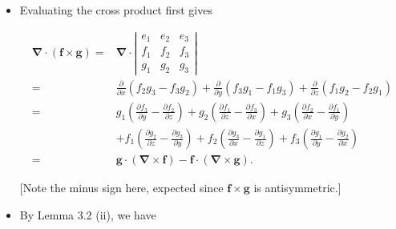 \begin{formalproof}
\begin{itemize}
\item[(iii)] Evaluating the cross product first gives

\[
\begin{aligned}
\boldsymbol{\nabla} \cdot(\boldsymbol{f} \times \boldsymbol{g})= & \boldsymbol{\nabla} \cdot\left|\begin{array}{lll}
e_1 & e_2 & e_3 \\
f_1 & f_2 & f_3 \\
g_1 & g_2 & g_3
\end{array}\right| \\
= & \frac{\partial}{\partial x}\left(f_2 g_3-f_3 g_2\right)+\frac{\partial}{\partial y}\left(f_3 g_1-f_1 g_3\right)+\frac{\partial}{\partial z}\left(f_1 g_2-f_2 g_1\right) \\
= & g_1\left(\frac{\partial f_3}{\partial y}-\frac{\partial f_2}{\partial z}\right)+g_2\left(\frac{\partial f_1}{\partial z}-\frac{\partial f_3}{\partial x}\right)+g_3\left(\frac{\partial f_2}{\partial x}-\frac{\partial f_1}{\partial y}\right) \\
& +f_1\left(\frac{\partial g_2}{\partial z}-\frac{\partial g_3}{\partial y}\right)+f_2\left(\frac{\partial g_3}{\partial x}-\frac{\partial g_1}{\partial z}\right)+f_3\left(\frac{\partial g_1}{\partial y}-\frac{\partial g_2}{\partial x}\right) \\
= & \boldsymbol{g} \cdot(\boldsymbol{\nabla} \times \boldsymbol{f})-\boldsymbol{f} \cdot(\boldsymbol{\nabla} \times \boldsymbol{g}) .
\end{aligned}
\]

[Note the minus sign here, expected since \(\boldsymbol{f} \times \boldsymbol{g}\) is antisymmetric.]
\item [(iv)] By Lemma 3.2 (ii), we have


\end{itemize}
\end{formalproof}

